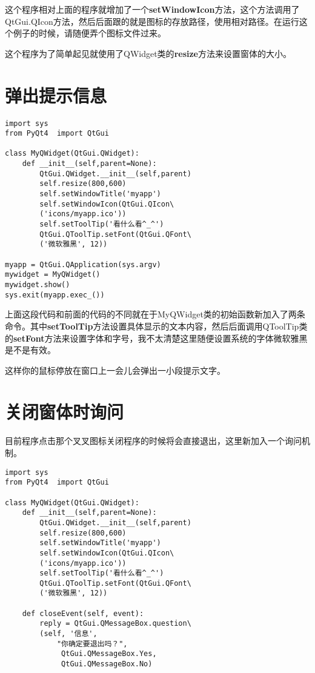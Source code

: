 \documentclass[12pt,oneside]{book}
\begin{document}
\begin{common-format}
这个程序相对上面的程序就增加了一个\textbf{setWindowIcon}方法，这个方法调用了QtGui.QIcon方法，然后后面跟的就是图标的存放路径，使用相对路径。在运行这个例子的时候，请随便弄个图标文件过来。

这个程序为了简单起见就使用了QWidget类的\textbf{resize}方法来设置窗体的大小。



\section{弹出提示信息}
\begin{Verbatim}
import sys
from PyQt4  import QtGui

class MyQWidget(QtGui.QWidget):
    def __init__(self,parent=None):
        QtGui.QWidget.__init__(self,parent)
        self.resize(800,600)
        self.setWindowTitle('myapp')
        self.setWindowIcon(QtGui.QIcon\
        ('icons/myapp.ico'))
        self.setToolTip('看什么看^_^')
        QtGui.QToolTip.setFont(QtGui.QFont\
        ('微软雅黑', 12))

myapp = QtGui.QApplication(sys.argv)
mywidget = MyQWidget()
mywidget.show()
sys.exit(myapp.exec_())
\end{Verbatim}

上面这段代码和前面的代码的不同就在于MyQWidget类的初始函数新加入了两条命令。其中\textbf{setToolTip}方法设置具体显示的文本内容，然后后面调用QToolTip类的\textbf{setFont}方法来设置字体和字号，我不太清楚这里随便设置系统的字体微软雅黑是不是有效。

这样你的鼠标停放在窗口上一会儿会弹出一小段提示文字。


\section{关闭窗体时询问}
目前程序点击那个叉叉图标关闭程序的时候将会直接退出，这里新加入一个询问机制。
\begin{Verbatim}
import sys
from PyQt4  import QtGui

class MyQWidget(QtGui.QWidget):
    def __init__(self,parent=None):
        QtGui.QWidget.__init__(self,parent)
        self.resize(800,600)
        self.setWindowTitle('myapp')
        self.setWindowIcon(QtGui.QIcon\
        ('icons/myapp.ico'))
        self.setToolTip('看什么看^_^')
        QtGui.QToolTip.setFont(QtGui.QFont\
        ('微软雅黑', 12))

    def closeEvent(self, event):
        reply = QtGui.QMessageBox.question\
        (self, '信息',
            "你确定要退出吗？",
             QtGui.QMessageBox.Yes,
             QtGui.QMessageBox.No)


\end{Verbatim}
\end{common-format}
\end{document}
